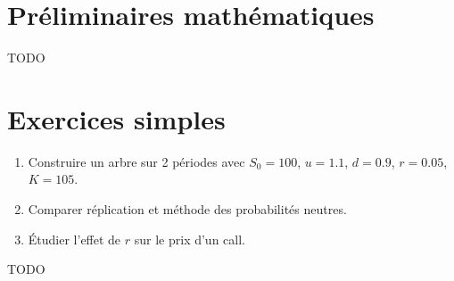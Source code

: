 \documentclass[12pt,a4paper]{article}
\begin{document}
\appendix

\section{Préliminaires mathématiques}
TODO

\section{Exercices simples}
\begin{enumerate}
  \item Construire un arbre sur 2 périodes avec $S_0 = 100$, $u = 1.1$, $d = 0.9$, $r = 0.05$, $K = 105$.
  \item Comparer réplication et méthode des probabilités neutres.
  \item Étudier l’effet de $r$ sur le prix d’un call.
\end{enumerate}

TODO 
\end{document}
